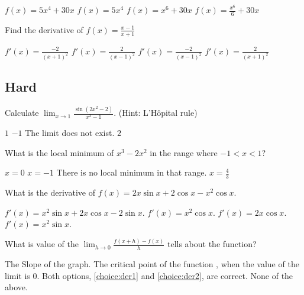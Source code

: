 \documentclass{exam}
\begin{document}
\begin{questions}
    \begin{choices}
		\choice $f(x) = 5x^4 +30x$
		\choice $f(x) = 5x^4$
		\choice $f(x) = x^6 +30x$
		\CorrectChoice $f(x) = \frac{x^6}{6} +30x$
	\end{choices}
	\question Find the derivative of $f(x) = \frac{x-1}{x+1}$

	\begin{choices}
		\choice $f'(x) = \frac{-2}{(x+1)^2}$
		\choice $f'(x) = \frac{2}{(x-1)^2}$
		\choice $f'(x) = \frac{-2}{(x-1)^2}$
		\CorrectChoice $f'(x) = \frac{2}{(x+1)^2}$
	\end{choices}

\end{questions}




\begin{questions}

\section{Hard}
	\question  Calculate $\lim_{x\to 1}\frac{\sin (2x^2-2)}{x^2-1}$. (Hint: L'H\^opital rule)

	\begin{choices}
		\choice   $1$
		\choice  $-1$
		\choice  The limit does not exist.
		\CorrectChoice  $2$
	\end{choices}
	\question What is the local minimum of $x^3-2x^2$ in the range where $-1<x<1$?

	\begin{choices}
		\choice  $x=0$
		\choice  $x=-1$
		\choice There is no local minimum in that range.
		\CorrectChoice  $x=\frac43$
	\end{choices}
	\question What is the derivative of $f(x) = 2x \sin x + 2 \cos x - x^{2}\cos x.$

	\begin{choices}
		\choice $f'(x) = x^{2} \sin x + 2 x \cos x -2\sin x$.
		\choice $f'(x) = x^{2}\cos x$.
		\choice $f'(x) = 2x\cos x$.
		\CorrectChoice $f'(x) = x^{2}\sin x$.
	\end{choices}

	\question What is value of the $\displaystyle \lim_{h \to 0} \frac{f(x+h) -f(x)}{h}$ tells about the function?

	\begin{choices}
		\choice\label{choice:der1} The Slope of the graph.
		\choice\label{choice:der2} The critical point of the function , when the value of the limit is 0.
		\CorrectChoice Both options, \ref{choice:der1} and \ref{choice:der2}, are correct.
		\choice None of the above.
	\end{choices}


\end{questions}
\end{document}
